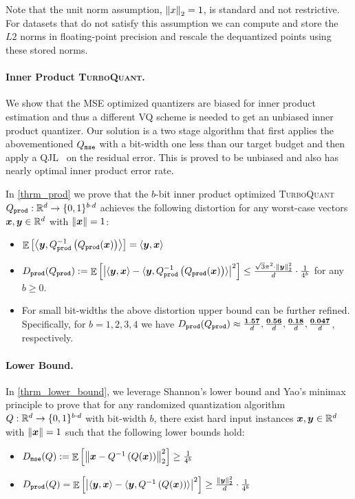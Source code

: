 \documentclass[11pt]{article}
\newcommand{\TurboQuant}{\textsc{TurboQuant}\xspace}
\begin{document}
Note that the unit norm assumption, $\left\| x \right\|_2=1$, is standard and not restrictive. 
For datasets that do not satisfy this assumption we can compute and store the $L2$ norms in floating-point precision and rescale the dequantized points using these stored norms.

\paragraph{Inner Product \TurboQuant.}
We show that the MSE optimized quantizers are biased for inner product estimation and thus a different VQ scheme is needed to get an unbiased inner product quantizer.
Our solution is a two stage algorithm that first applies the abovementioned $Q_{\tt mse}$ with a bit-width one less than our target budget and then apply a QJL~\cite{qjl} on the residual error.
This is proved to be unbiased and also has nearly optimal inner product error rate.

In \cref{thrm_prod} we prove that the $b$-bit inner product optimized \TurboQuant $Q_{\tt prod}: \mathbb{R}^d \to \{ 0, 1 \}^{b \cdot d}$ achieves the following distortion for any worst-case vectors ${\bm x}, {\bm y} \in \mathbb{R}^d$ with $\left\| {\bm x} \right\|=1$:
\begin{itemize}
    \item $\mathop{{\mathbb{E}}}\left[ \left< {\bm y}, Q_{\tt prod}^{-1}\left( Q_{\tt prod}({\bm x}) \right) \right> \right] = \langle {\bm y}, {\bm x} \rangle$
    \item $D_{\tt prod}(Q_{\tt prod}) := \mathop{{\mathbb{E}}}\left[\left| \langle {\bm y}, {\bm x} \rangle - \langle {\bm y}, Q_{\tt prod}^{-1}\left( Q_{\tt prod}({\bm x}) \right) \rangle \right|^2 \right] \le \frac{\sqrt{3} \pi^2 \cdot \left\| {\bm y} \right\|_2^2}{d} \cdot \frac{1}{4^{b}}$ for any $b \ge 0$.
    \item For small bit-widths the above distortion upper bound can be further refined. 
    Specifically, for $b = 1, 2, 3, 4$ we have $D_{\tt prod}(Q_{\tt prod}) \approx \frac{\bf 1.57}{d}, \frac{\bf 0.56}{d}, \frac{\bf 0.18}{d}, \frac{\bf 0.047}{d}$, respectively.
\end{itemize}


\paragraph{Lower Bound.}
In \cref{thrm_lower_bound}, we leverage Shannon's lower bound and Yao's minimax principle to prove that for any randomized quantization algorithm $Q: \mathbb{R}^d \to \{ 0, 1 \}^{b \cdot d}$ with bit-width $b$, there exist hard input instances ${\bm x}, {\bm y} \in \mathbb{R}^d$ with $\left\| {\bm x} \right\| = 1$ such that the following lower bounds hold:
\begin{itemize}
    \item $D_{\tt mse}(Q) := \mathop{{\mathbb{E}}}\left[\left\| {\bm x} - Q^{-1}\left( Q({\bm x}) \right) \right\|_2^2 \right] \ge \frac{1}{4^{b}}$
    \item $D_{\tt prod}(Q) = \mathop{{\mathbb{E}}}\left[\left| \langle {\bm y}, {\bm x} \rangle - \langle {\bm y}, Q^{-1}\left( Q({\bm x}) \right) \rangle \right|^2 \right] \ge \frac{\left\| {\bm y} \right\|_2^2}{d} \cdot \frac{1}{4^{b}}$
\end{itemize}
\end{document}
